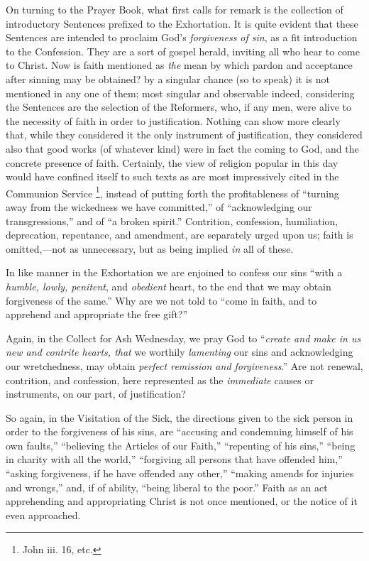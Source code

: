 On turning to the Prayer Book, what first calls for
remark is the collection of introductory Sentences prefixed to the
Exhortation. It is quite evident that these Sentences are
intended to proclaim God's \emph{forgiveness of sin}, as a fit
introduction to the Confession. They are a sort of gospel herald,
inviting all who hear to come to Christ. Now is faith mentioned as \emph{the}
mean by which pardon and acceptance after sinning may be obtained? by
a singular chance (so to speak) it is not mentioned in any one of
them; most singular and observable indeed, considering the Sentences
are the selection of the Reformers, who, if any men, were alive to the
necessity of faith in order to justification. Nothing can show more
clearly that, while they considered it the only instrument of
justification, they considered also that good works (of whatever kind)
were in fact the coming to God, and the concrete presence of faith.
Certainly, the view of religion popular in this day would have
confined itself to such texts as are most impressively cited in the
Communion Service \footnote{John iii. 16, etc.}, instead
of putting forth the profitableness of ``turning away from the
wickedness we have committed,'' of ``acknowledging our
transgressions,'' and of ``a broken spirit.'' Contrition,
confession, humiliation, deprecation, repentance, and amendment, are
separately urged upon us; faith is omitted,—not as unnecessary, but
as being implied \emph{in} all of these.

In like manner in the Exhortation we are enjoined
to confess our sins ``with a \emph{humble,
lowly, penitent}, and \emph{obedient} heart, to the end that we may
obtain forgiveness of the same.'' Why are we not told to
``come in faith, and to apprehend and appropriate the free
gift?''

Again, in the Collect for Ash Wednesday, we pray
God to ``\emph{create and make in us new and contrite hearts, that}
we worthily \emph{lamenting} our sins and acknowledging our
wretchedness, may obtain \emph{perfect remission and forgiveness}.''
Are not renewal, contrition, and confession, here represented as the \emph{immediate}
causes or instruments, on our part, of justification?

So again, in the Visitation of the Sick, the
directions given to the sick person in order to the forgiveness of his
sins, are ``accusing and condemning himself of his own
faults,'' ``believing the Articles of our Faith,'' ``repenting of his sins,''
``being
in charity with all the world,'' ``forgiving all persons
that have offended him,'' ``asking forgiveness, if he have
offended any other,'' ``making amends for injuries and
wrongs,'' and, if of ability, ``being liberal to the
poor.'' Faith as an act apprehending and appropriating Christ is
not once mentioned, or the notice of it even approached.

